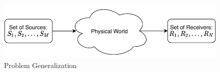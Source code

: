 \begin{figure}[H]
    \begin{center}
    \includegraphics[width=\textwidth]{figures/introduction/figIntro.pdf}
    \end{center}
    \caption[Problem Generalization]{Problem Generalization}
    \label{fig:Intro}
\end{figure}